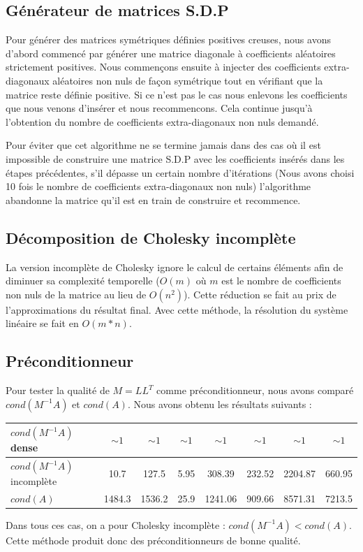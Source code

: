 \documentclass{article}
\begin{document}
\subsection{G\'en\'erateur de matrices S.D.P}
Pour g\'en\'erer des matrices sym\'etriques d\'efinies positives creuses, nous avons d'abord commenc\'e par g\'en\'erer une matrice diagonale \`a coefficients al\'eatoires strictement positives. Nous commençons ensuite \`a injecter des coefficients extra-diagonaux al\'eatoires non nuls de façon sym\'etrique tout en v\'erifiant que la matrice reste d\'efinie positive. Si ce n'est pas le cas nous enlevons les coefficients que nous venons d'ins\'erer et nous recommencons. Cela continue jusqu'\`a l'obtention du nombre de coefficients extra-diagonaux non nuls demand\'e.

Pour \'eviter que cet algorithme ne se termine jamais dans des cas o\`u il est impossible de construire une matrice S.D.P avec les coefficients ins\'er\'es dans les \'etapes pr\'ec\'edentes, s'il d\'epasse un certain nombre d'it\'erations (Nous avons choisi 10 fois le nombre de coefficients extra-diagonaux non nuls) l'algorithme abandonne la matrice qu'il est en train de construire et recommence.
\subsection{D\'ecomposition de Cholesky incompl\`ete}
La version incompl\`ete de Cholesky ignore le calcul de certains \'el\'ements afin de diminuer sa complexit\'e temporelle ($O(m)$ o\`u $m$ est le nombre de coefficients non nuls de la matrice au lieu de $O(n^2)$). Cette r\'eduction se fait au prix de l'approximations du r\'esultat final.
Avec cette m\'ethode, la r\'esolution du syst\`eme lin\'eaire se fait en $O(m*n)$.

\subsection{Pr\'econditionneur}
Pour tester la qualit\'e de $M=LL^T$ comme pr\'econditionneur, nous avons compar\'e $cond(M^{-1}A)$ et $cond(A)$. Nous avons obtenu les r\'esultats suivants :
\begin{center}
\begin{tabular}{|l|c|c|c|c|c|c|c|}
  \hline
  $cond(M^{-1}A)$ dense & $\sim1$ & $\sim1$ & $\sim1$ & $\sim1$ & $\sim1$ & $\sim1$ & $\sim1$ \\
  \hline
  $cond(M^{-1}A)$ incompl\`ete & 10.7 & 127.5 & 5.95 & 308.39 & 232.52 & 2204.87 & 660.95 \\
  \hline
  $cond(A)$ & 1484.3 & 1536.2 & 25.9 & 1241.06 & 909.66 & 8571.31 & 7213.5 \\
  \hline
\end{tabular}
\end{center}
Dans tous ces cas, on a pour Cholesky incompl\`ete : $cond(M^{-1}A) < cond(A)$. Cette m\'ethode produit donc des pr\'econditionneurs de bonne qualit\'e.
\end{document}
